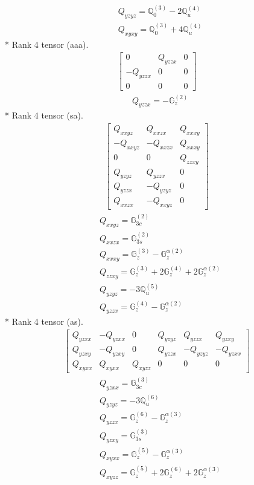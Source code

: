 \documentclass[fleqn,8pt,landscape]{jsarticle}
\begin{document}
\begin{align*}
& Q_{yzyz} = \mathbb{Q}_{0}^{(3)} - 2 \mathbb{Q}_{u}^{(4)} \\
& Q_{xyxy} = \mathbb{Q}_{0}^{(3)} + 4 \mathbb{Q}_{u}^{(4)}
\end{align*}
* Rank 4 tensor (aaa).
\begin{align*}
\begin{bmatrix} 0 & Q_{yzzx} & 0 \\ - Q_{yzzx} & 0 & 0 \\ 0 & 0 & 0 \end{bmatrix}
\end{align*}
\begin{align*}
& Q_{yzzx} = - \mathbb{G}_{z}^{(2)}
\end{align*}
* Rank 4 tensor (sa).
\begin{align*}
\begin{bmatrix} Q_{xxyz} & Q_{xxzx} & Q_{xxxy} \\ - Q_{xxyz} & - Q_{xxzx} & Q_{xxxy} \\ 0 & 0 & Q_{zzxy} \\ Q_{yzyz} & Q_{yzzx} & 0 \\ Q_{yzzx} & - Q_{yzyz} & 0 \\ Q_{xxzx} & - Q_{xxyz} & 0 \end{bmatrix}
\end{align*}
\begin{align*}
& Q_{xxyz} = \mathbb{G}_{3c}^{(2)} \\
& Q_{xxzx} = \mathbb{G}_{3s}^{(2)} \\
& Q_{xxxy} = \mathbb{G}_{z}^{(3)} - \mathbb{G}_{z}^{\alpha(2)} \\
& Q_{zzxy} = \mathbb{G}_{z}^{(3)} + 2 \mathbb{G}_{z}^{(4)} + 2 \mathbb{G}_{z}^{\alpha(2)} \\
& Q_{yzyz} = - 3 \mathbb{Q}_{u}^{(5)} \\
& Q_{yzzx} = \mathbb{G}_{z}^{(4)} - \mathbb{G}_{z}^{\alpha(2)}
\end{align*}
* Rank 4 tensor (as).
\begin{align*}
\begin{bmatrix} Q_{yzxx} & - Q_{yzxx} & 0 & Q_{yzyz} & Q_{yzzx} & Q_{yzxy} \\ Q_{yzxy} & - Q_{yzxy} & 0 & Q_{yzzx} & - Q_{yzyz} & - Q_{yzxx} \\ Q_{xyxx} & Q_{xyxx} & Q_{xyzz} & 0 & 0 & 0 \end{bmatrix}
\end{align*}
\begin{align*}
& Q_{yzxx} = \mathbb{G}_{3c}^{(3)} \\
& Q_{yzyz} = - 3 \mathbb{Q}_{u}^{(6)} \\
& Q_{yzzx} = \mathbb{G}_{z}^{(6)} - \mathbb{G}_{z}^{\alpha(3)} \\
& Q_{yzxy} = \mathbb{G}_{3s}^{(3)} \\
& Q_{xyxx} = \mathbb{G}_{z}^{(5)} - \mathbb{G}_{z}^{\alpha(3)} \\
& Q_{xyzz} = \mathbb{G}_{z}^{(5)} + 2 \mathbb{G}_{z}^{(6)} + 2 \mathbb{G}_{z}^{\alpha(3)}
\end{align*}
\end{document}
